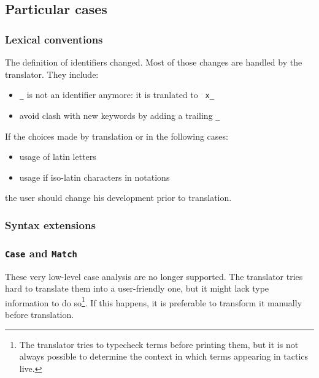 \documentclass[11pt,a4paper]{article}
\begin{document}

\subsection{Particular cases}

\subsubsection{Lexical conventions}

The definition of identifiers changed. Most of those changes are
handled by the translator. They include:
\begin{itemize}
\item {\tt \_} is not an identifier anymore: it is tranlated to {\tt
x\_}
\item avoid clash with new keywords by adding a trailing {\tt \_}
\end{itemize}

If the choices made by translation or in the following cases:
\begin{itemize}
\item usage of latin letters
\item usage if iso-latin characters in notations
\end{itemize}
the user should change his development prior to translation.


\subsubsection{Syntax extensions}

\subsubsection{{\tt Case} and {\tt Match}}

These very low-level case analysis are no longer supported. The
translator tries hard to translate them into a user-friendly one, but
it might lack type information to do so\footnote{The translator tries
to typecheck terms before printing them, but it is not always possible
to determine the context in which terms appearing in tactics
live.}. If this happens, it is preferable to transform it manually
before translation.
\end{document}
